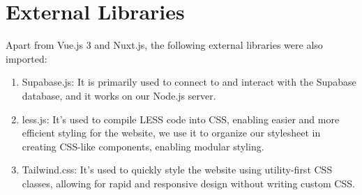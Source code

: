 \section{External Libraries}
Apart from Vue.js 3 and Nuxt.js, the following external libraries were also imported:
\begin{enumerate}
	\item Supabase.js: It is primarily used to connect to and interact with the Supabase database, and it works on our Node.js server.
	\item less.js: It's used to compile LESS code into CSS, enabling easier and more efficient styling for the website, we use it to organize our stylesheet in creating CSS-like components, enabling modular styling.
	\item Tailwind.css: It's used to quickly style the website using utility-first CSS classes, allowing for rapid and responsive design without writing custom CSS.
\end{enumerate}